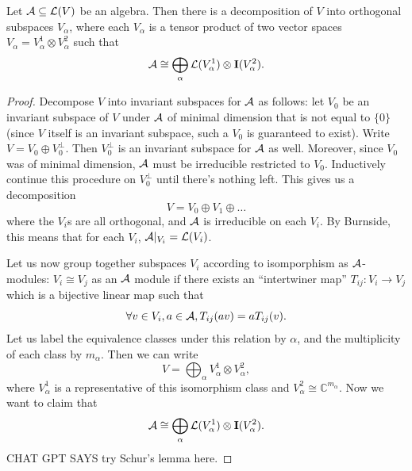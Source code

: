 \begin{lemma}
    Let $\mathcal{A} \subseteq \mathcal{L}(V)$ be an algebra. Then there is a decomposition of $V$ into orthogonal subspaces $V_\alpha$, where each $V_\alpha$ is a tensor product of two vector spaces $V_\alpha = V^1_\alpha \otimes V^2_\alpha$ such that
    \[ \mathcal{A} \cong \bigoplus_{\alpha} \mathcal{L}(V^1_\alpha) \otimes \mathbf{I}(V^2_\alpha). \]
    
\end{lemma}
\begin{proof}
    Decompose $V$ into invariant subspaces for $\mathcal{A}$ as follows: let $V_0$ be an invariant subspace of $V$ under $\mathcal{A}$ of minimal dimension that is not equal to $\{0\}$ (since $V$ itself is an invariant subspace, such a $V_0$ is guaranteed to exist). Write $V = V_0 \oplus V_0^\perp$. Then $V_0^\perp$ is an invariant subspace for $\mathcal{A}$ as well. Moreover, since $V_0$ was of minimal dimension, $\mathcal{A}$ must be irreducible restricted to $V_0$. Inductively continue this procedure on $V_0^\perp$ until there's nothing left. This gives us a decomposition
    \[ V = V_0 \oplus V_1 \oplus \dots \]
    where the $V_i$s are all orthogonal, and $\mathcal{A}$ is irreducible on each $V_i$. By Burnside, this means that for each $V_i$, $\mathcal{A}|_{V_i} = \mathcal{L}(V_i)$. 

    Let us now group together subspaces $V_i$ according to isomporphism as $\mathcal{A}$-modules: $V_i \cong V_j$ as an $\mathcal{A}$ module if there exists an ``intertwiner map'' $T_{ij}: V_i \to V_j $ which is a bijective linear map such that 
    \[ \forall v \in V_i, a \in \mathcal{A}, T_{ij}(a v) = a T_{ij}(v).\] Let us label the equivalence classes under this relation by $\alpha$, and the multiplicity of each class by $m_\alpha$. Then we can write
    \[ V = \bigoplus_\alpha V^1_\alpha \otimes V^2_\alpha, \]
    where $V^1_\alpha$ is a representative of this isomorphism class and $V^2_\alpha \cong \mathbb{C}^{m_\alpha}$. Now we want to claim that
    \[ \mathcal{A} \cong \bigoplus_\alpha \mathcal{L}(V^1_\alpha) \otimes \mathbf{I}(V^2_\alpha).\]
    CHAT GPT SAYS try Schur's lemma here. 




\end{proof}

